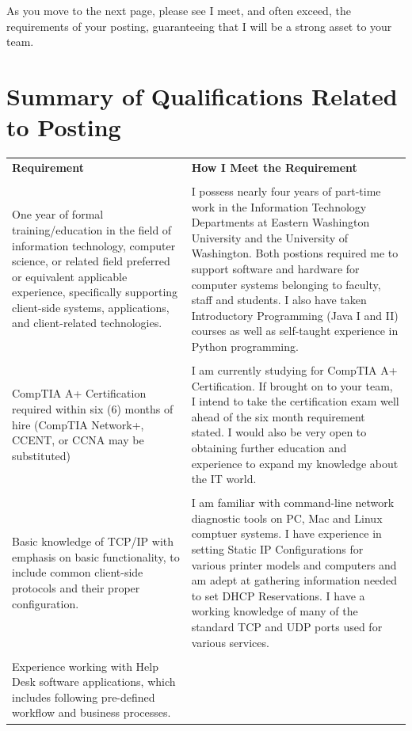 \documentclass[a4paper,10pt]{article}
\begin{document}
\par
As you move to the next page, please see I meet, and often exceed, the requirements of your posting, guaranteeing that I will be a strong asset to your team.\\
\pagebreak
\section{Summary of Qualifications Related to Posting}
\begin{longtable}{|p{.35\linewidth}|p{.6\linewidth}|}
	\textbf{Requirement} & \textbf{How I Meet the Requirement}\\
	&\\
	One year of formal training/education in the field of information technology, computer science, or related field preferred or equivalent applicable experience, specifically supporting client-side systems, applications, and client-related technologies. 
	& I possess nearly four years of part-time work in the Information Technology Departments at Eastern Washington University and the University of Washington. Both postions required me to support software and hardware for computer systems belonging to faculty, staff and students. I also have taken Introductory Programming (Java I and II) courses as well as self-taught experience in Python programming. \\
	&\\
	CompTIA A+ Certification required within six (6) months of hire (CompTIA Network+, CCENT, or CCNA may be substituted)
	& I am currently studying for CompTIA A+ Certification. If brought on to your team, I intend to take the certification exam well ahead of the six month requirement stated. I would also be very open to obtaining further education and experience to expand my knowledge about the IT world.\\
	&\\
	Basic knowledge of TCP/IP with emphasis on basic functionality, to include common client-side protocols and their proper configuration. 
	& I am familiar with command-line network diagnostic tools on PC, Mac and Linux comptuer systems. I have experience in setting Static IP Configurations for various printer models and computers and am adept at gathering information needed to set DHCP Reservations. I have a working knowledge of many of the standard TCP and UDP ports used for various services.\\
	&\\
	Experience working with Help Desk software applications, which includes following pre-defined workflow and business processes.

\end{longtable}
\end{document}
